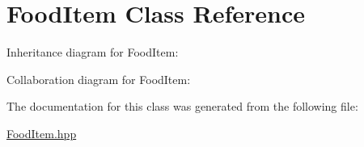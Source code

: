 \hypertarget{classFoodItem}{}\section{Food\+Item Class Reference}
\label{classFoodItem}


Inheritance diagram for Food\+Item\+:


Collaboration diagram for Food\+Item\+:


The documentation for this class was generated from the following file\+:\begin{DoxyCompactItemize}
\item 
\hyperlink{FoodItem_8hpp}{Food\+Item.\+hpp}\end{DoxyCompactItemize}
